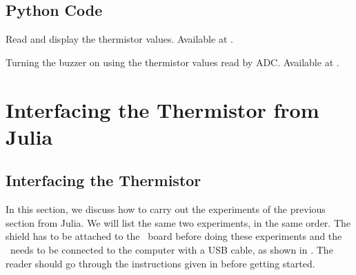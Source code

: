\subsection{Python Code}
\label{sec:therm-pyhton-code}

\begin{pycode}
   {Read and display
    the thermistor values.  Available at
    .}
  \label{py:therm-read}
  
\end{pycode}

\begin{pycode}
  {Turning the buzzer on using the thermistor values read by
    ADC.  Available at .}
  \label{py:therm-buzzer}
  
\end{pycode}

\section{Interfacing the Thermistor from Julia}
\subsection{Interfacing the Thermistor}
In this section, we discuss how to carry out the experiments of the
previous section from Julia.  We will list the same two experiments,
in the same order.  The shield has to be attached to the \arduino\ board
before doing these experiments and the \arduino\ needs to be connected to the computer
with a USB cable, as shown in .
The reader should go through the instructions given in  before getting started.


